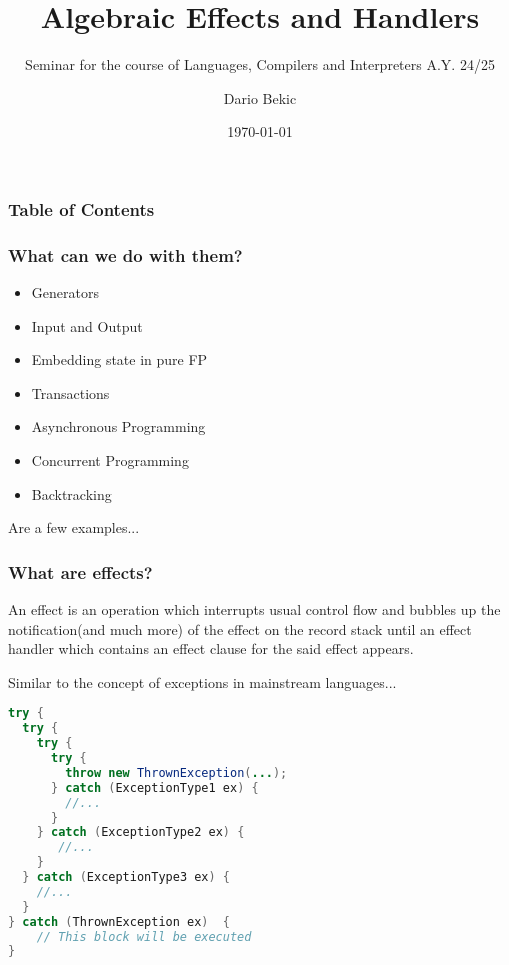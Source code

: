\documentclass[t]{beamer}
\title{Algebraic Effects and Handlers}
\author{Dario Bekic}
\subtitle{Seminar for the course of Languages, Compilers and Interpreters
A.Y. 24/25}
\date{\today}
\begin{document}
\begin{frame}
  \titlepage
\end{frame}

\begin{frame}
  \frametitle{Table of Contents}
  \tableofcontents
\end{frame}

\begin{frame}
  \frametitle{What can we do with them?}
   \begin{itemize}
  \item Generators
  \item Input and Output
  \item Embedding state in pure FP 
  \item Transactions
  \item Asynchronous Programming
  \item Concurrent Programming
  \item Backtracking
   \end{itemize}
   Are a few examples...
\end{frame}

\begin{frame}[fragile]
\frametitle{What are effects?}

An effect is an operation which interrupts usual control flow and bubbles up the notification(and much more) of the effect on the record stack until an \alert{effect handler} which contains an \alert{effect clause} for the said effect appears.

Similar to the concept of exceptions in mainstream languages...

\begin{lstlisting}[language=java, basicstyle=\scriptsize\ttfamily, breaklines=true, xleftmargin=0em, lineskip=-1pt, aboveskip=0pt, belowskip=0pt, moredelim={[is][\color{red}]{STARTRC}{ENDRC}}]
try {
  try {
    try {
      try {
	    throw new ThrownException(...);
      } catch (ExceptionType1 ex) {
		//...
      }
    } catch (ExceptionType2 ex) {
	   //...	
    }
  } catch (ExceptionType3 ex) {
    //...
  }
} catch (ThrownException ex)  {
	// This block will be executed 
}
\end{lstlisting}

\end{frame}
\end{document}
